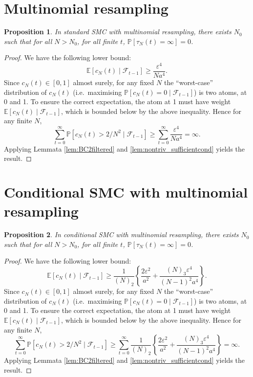 \documentclass{article}
\newtheorem{prop}{Proposition}
\newcommand{\Prob}{\mathbb{P}}
\newcommand{\E}{\mathbb{E}}
\newcommand{\1}[1]{\mathbb{I}_{#1}}
\begin{document}
\section*{Multinomial resampling}

\begin{prop}
In standard SMC with multinomial resampling, there exists $N_0$ such that for all $N>N_0$, for all finite $t$, $\Prob[\tau_N(t) = \infty] =0$.
\end{prop}

\begin{proof}
We have the following lower bound:
\begin{equation*}
\E [c_N(t) \mid \mathcal{F}_{t-1}] \geq \frac{\varepsilon^4}{Na^4}.
\end{equation*}
Since $c_N(t) \in [0,1]$ almost surely, for any fixed $N$ the ``worst-case'' distribution of $c_N(t)$ (i.e.\ maximising $\Prob[c_N(t)=0 \mid \mathcal{F}_{t-1}]$) is two atoms, at 0 and 1. To ensure the correct expectation, the atom at 1 must have weight $\E[c_N(t) \mid \mathcal{F}_{t-1}]$, which is bounded below by the above inequality.
Hence for any finite $N$,
\begin{equation*}
\sum_{t=0}^\infty \Prob[ c_N(t) > 2/N^2 \mid \mathcal{F}_{t-1}] 
\geq \sum_{t=0}^\infty \frac{\varepsilon^4}{Na^4}
= \infty .
\end{equation*}
Applying Lemmata \ref{lem:BC2filtered} and \ref{lem:nontriv_sufficientcond} yields the result.
\end{proof}


\section*{Conditional SMC with multinomial resampling}

\begin{prop}
In conditional SMC with multinomial resampling, there exists $N_0$ such that for all $N>N_0$, for all finite $t$, $\Prob[\tau_N(t) = \infty] =0$.
\end{prop}

\begin{proof}
We have the following lower bound:
\begin{equation*}
\E [c_N(t) \mid \mathcal{F}_{t-1}] \geq \frac{1}{(N)_2} \left\{ \frac{2\varepsilon^2}{a^2} + \frac{(N)_3 \varepsilon^4}{(N-1)^2 a^4} \right\} .
\end{equation*}
Since $c_N(t) \in [0,1]$ almost surely, for any fixed $N$ the ``worst-case'' distribution of $c_N(t)$ (i.e.\ maximising $\Prob[c_N(t)=0 \mid \mathcal{F}_{t-1}]$) is two atoms, at 0 and 1. To ensure the correct expectation, the atom at 1 must have weight $\E[c_N(t) \mid \mathcal{F}_{t-1}]$, which is bounded below by the above inequality.
Hence for any finite $N$,
\begin{equation*}
\sum_{t=0}^\infty \Prob[ c_N(t) > 2/N^2 \mid \mathcal{F}_{t-1}] 
\geq \sum_{t=0}^\infty \frac{1}{(N)_2} \left\{ \frac{2\varepsilon^2}{a^2} + \frac{(N)_3 \varepsilon^4}{(N-1)^2 a^4} \right\}
= \infty .
\end{equation*}
Applying Lemmata \ref{lem:BC2filtered} and \ref{lem:nontriv_sufficientcond} yields the result.
\end{proof}
\end{document}
